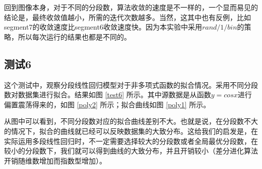 回到图像本身，对于不同的分段数，算法收敛的速度是不一样的，一个显而易见的结论是，最终收敛值越小，所需的迭代次数越多。当然，这其中也有反例，比如segment7的收敛速度比segment6收敛速度快。因为本实验中采用$rand/1/bin$的策略，所以每次运行的结果也都是不同的。


\subsection{测试6}

这个测试中，观察分段线性回归模型对于非多项式函数的拟合情况。采用不同分段数对数据集进行拟合。结果如图 \ref{test6} 所示。其中源数据是从函数$y=cosx$进行偏置震荡得来的，如图 \ref{poly2} 所示；拟合曲线如图 \ref{poly1} 所示。

从图中可以看到，不同分段数对应的拟合曲线差别不大。也就是说，在分段数不大的情况下，拟合的曲线就已经可以反映数据集的大致分布。这给我们的启发是，在实际运用多段线性回归时，不一定需要选择较大的分段数或者全局最优分段数，在较小的分段数下，我们就可以得到曲线的大致分布，并且开销较小（差分进化算法开销随维数增加而指数型增加）。

